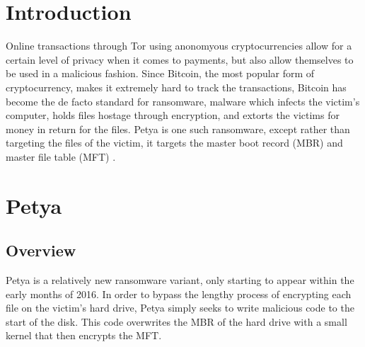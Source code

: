 \documentclass[twocolumn]{article}
\begin{document}

\section{Introduction}
\label{sec:introduction}
Online transactions through Tor \cite{tor} using anonomyous cryptocurrencies allow for a certain level of privacy when it comes to payments, but also allow themselves to be used in a malicious fashion. Since Bitcoin, the most popular form of cryptocurrency, makes it extremely hard to track the transactions, Bitcoin has become the de facto standard for ransomware, malware which infects the victim's computer, holds files hostage through encryption, and extorts the victims for money in return for the files. Petya is one such ransomware, except rather than targeting the files of the victim, it targets the master boot record (MBR) and master file table (MFT) \cite{decryptPetya}.

\section{Petya}
\label{sec:petya}
\subsection{Overview}
Petya is a relatively new ransomware variant, only starting to appear within the early months of 2016. In order to bypass the lengthy process of encrypting each file on the victim's hard drive, Petya simply seeks to write malicious code to the start of the disk. This code overwrites the MBR of the hard drive with a small kernel that then encrypts the MFT. 
\end{document}
